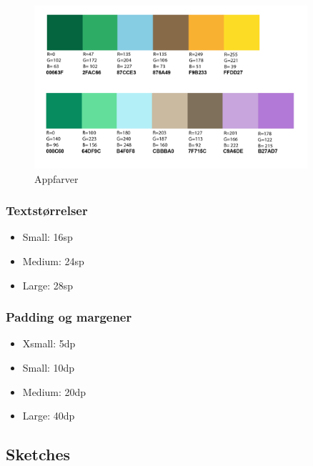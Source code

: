 \begin{figure}[H]
    \label{farver}
    \centering
    \includegraphics[width=0.9\textwidth]{img/colors.png}
    \caption{Appfarver}
\end{figure}

\subsubsection*{Textstørrelser}

\begin{itemize}
    \item Small: 16sp
    \item Medium: 24sp
    \item Large: 28sp
\end{itemize}

\subsubsection*{Padding og margener}

\begin{itemize}
    \item Xsmall: 5dp
    \item Small: 10dp
    \item Medium: 20dp
    \item Large: 40dp
\end{itemize}

\subsection{Sketches}
\label{sketches}

